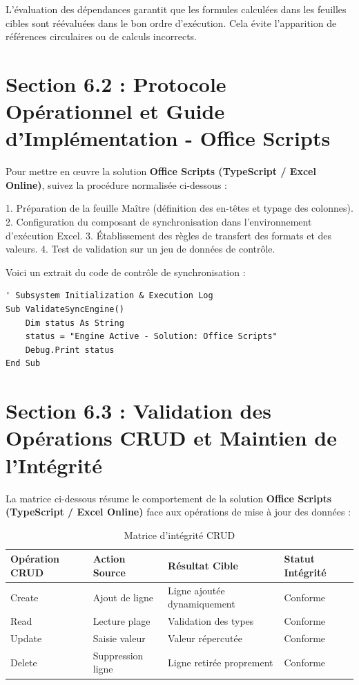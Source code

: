 \documentclass[12pt,a4paper]{report}
\begin{document}
L'évaluation des dépendances garantit que les formules calculées dans les feuilles cibles sont réévaluées dans le bon ordre d'exécution. Cela évite l'apparition de références circulaires ou de calculs incorrects.


\section{Section 6.2 : Protocole Opérationnel et Guide d'Implémentation - Office Scripts}
Pour mettre en œuvre la solution \textbf{Office Scripts (TypeScript / Excel Online)}, suivez la procédure normalisée ci-dessous :

1. Préparation de la feuille Maître (définition des en-têtes et typage des colonnes).
2. Configuration du composant de synchronisation dans l'environnement d'exécution Excel.
3. Établissement des règles de transfert des formats et des valeurs.
4. Test de validation sur un jeu de données de contrôle.

Voici un extrait du code de contrôle de synchronisation :
\begin{lstlisting}[caption=Code de controle operationnel]
' Subsystem Initialization & Execution Log
Sub ValidateSyncEngine()
    Dim status As String
    status = "Engine Active - Solution: Office Scripts"
    Debug.Print status
End Sub
\end{lstlisting}


\section{Section 6.3 : Validation des Opérations CRUD et Maintien de l'Intégrité}
La matrice ci-dessous résume le comportement de la solution \textbf{Office Scripts (TypeScript / Excel Online)} face aux opérations de mise à jour des données :

\begin{table}[h]
\centering
\begin{tabular}{@{}llll@{}}
\toprule
\textbf{Opération CRUD} & \textbf{Action Source} & \textbf{Résultat Cible} & \textbf{Statut Intégrité} \\ \midrule
Create & Ajout de ligne & Ligne ajoutée dynamiquement & Conforme \\
Read & Lecture plage & Validation des types & Conforme \\
Update & Saisie valeur & Valeur répercutée & Conforme \\
Delete & Suppression ligne & Ligne retirée proprement & Conforme \\ \bottomrule
\end{tabular}
\caption{Matrice d'intégrité CRUD}
\end{table}
\end{document}
